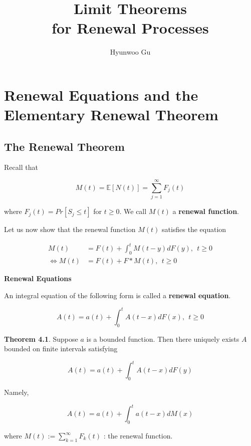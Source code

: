 \documentclass[12pt]{article}
\theoremstyle{nonumberbreak}
\begin{document}
\title{\textbf{Limit Theorems \\ for Renewal Processes}}
\author{Hyunwoo Gu}
\date{}

\maketitle

\section{Renewal Equations and the Elementary Renewal Theorem}

\subsection{The Renewal Theorem}

Recall that 

$$
M(t) = \mathbb{E} [ N(t) ] = \sum_{j=1}^\infty F_j(t)
$$

where $F_j(t) = Pr[ S_j \le t]$ for $t \ge 0$. We call $M(t)$ a \textbf{renewal function}.


Let us now show that the renewal function $M(t)$ satisfies the equation

$$
\begin{aligned}
M(t) &= F(t) + \int_0^t M(t-y) dF(y), \ \ t \ge 0 \\[8pt]
\Leftrightarrow M(t) &= F(t) + F \ast M(t), \ \ t \ge 0
\end{aligned}
$$



\textbf{Renewal Equations}

An integral equation of the following form is called a \textbf{renewal equation}. 

$$
A(t) = a(t) + \int_0^t A(t-x) dF(x), \ \ t \ge 0
$$


\begin{theorem}
\textbf{Theorem 4.1}. Suppose $a$ is a bounded function. Then there uniquely exists $A$ bounded on finite intervals satisfying

$$
A(t) = a(t) + \int_0^t A(t-x) dF(y)
$$


Namely, 

$$
A(t) = a(t) + \int_0^t a(t-x) dM(x)
$$

where $M(t) := \sum_{k=1}^\infty F_k(t)$ : the renewal function. 
\end{theorem}
\end{document}
